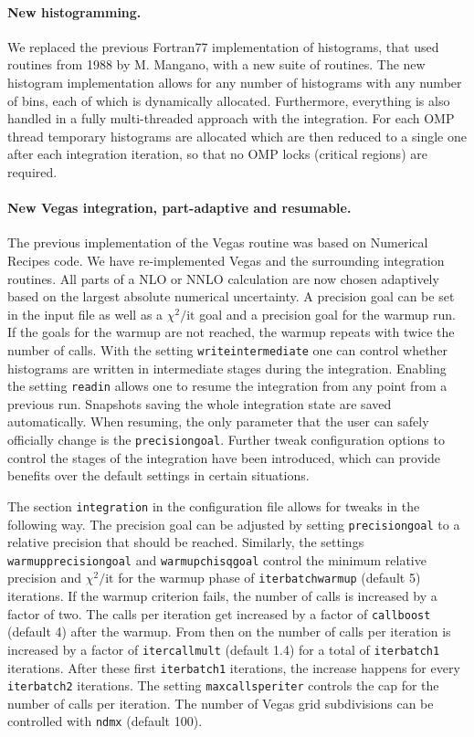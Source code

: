\paragraph{New histogramming.}

We replaced the previous Fortran77 implementation of histograms, that used routines from 1988 by M. Mangano,
with a new suite of routines.
The new histogram implementation allows for any number of histograms with any number of bins,
each of which is dynamically allocated. Furthermore, everything is also handled in a fully multi-threaded approach with 
the integration. For each OMP thread temporary 
histograms are allocated which are then reduced to a single one after each integration iteration, so that
no OMP locks (critical regions) are required. 

\paragraph{New Vegas integration, part-adaptive and resumable.}

The previous implementation of the Vegas routine was based on Numerical Recipes code. We have re-implemented
Vegas and the surrounding integration routines. All parts of a NLO or NNLO calculation are now
chosen adaptively based on the largest absolute numerical uncertainty. A precision goal can be set
in the input file as well as a $\chi^2/\text{it}$ goal and a precision goal for the warmup run. If
the goals for the warmup are not reached, the warmup repeats with twice the number of calls. With the
setting \texttt{writeintermediate} one can control whether histograms are written in intermediate
stages during the integration. Enabling the setting \texttt{readin} allows one to resume the integration
from any point from a previous run. Snapshots saving the whole integration state are saved automatically.
When resuming, the only parameter that the user can safely officially change is the \texttt{precisiongoal}. Further
tweak configuration options to control the stages of the integration have been introduced, which can provide
benefits over the default settings in certain situations.

The section \texttt{integration} in the configuration file allows for tweaks in the following way. The precision
goal can be adjusted by setting \texttt{precisiongoal} to a relative precision that should be reached. Similarly,
the settings \texttt{warmupprecisiongoal} and \texttt{warmupchisqgoal} control the minimum relative precision and
$\chi^2/\text{it}$ for the warmup phase of \texttt{iterbatchwarmup} (default 5) iterations. If the warmup criterion
fails, the number of calls is increased by a factor of two. The calls per iteration get increased by a factor of 
\texttt{callboost} (default 4) after the warmup. From then on the number of calls per iteration is 
increased by a factor of \texttt{itercallmult} (default 1.4) for a total of \texttt{iterbatch1} iterations. After these 
first \texttt{iterbatch1} iterations, the increase happens for every \texttt{iterbatch2} iterations. The setting 
\texttt{maxcallsperiter} controls the cap for the number of calls per iteration. The 
number of Vegas grid subdivisions can be controlled with \texttt{ndmx} (default 100).

